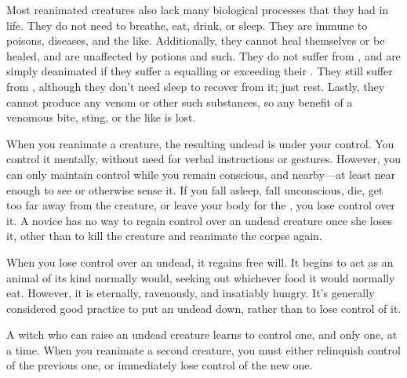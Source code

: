 Most reanimated creatures also lack many biological processes that they had in life.
They do not need to breathe, eat, drink, or sleep.
They are immune to poisons, diseases, and the like.
Additionally, they cannot heal themselves or be healed, and are unaffected by potions and such.
They do not suffer from {\shock}, and are simply deanimated if they suffer a {\damagetest} equalling or exceeding their .
They still suffer from {\exhaustion}, although they don't need sleep to recover from it; just rest.
Lastly, they cannot produce any venom or other such substances, so any benefit of a venomous bite, sting, or the like is lost.

When you reanimate a creature, the resulting undead is under your control.
You control it mentally, without need for verbal instructions or gestures.
However, you can only maintain control while you remain conscious, and nearby---at least near enough to see or otherwise sense it.
If you fall asleep, fall unconscious, die, get too far away from the creature, or leave your body for the {\mentalrealm}, you lose control over it.
A novice  has no way to regain control over an undead creature once she loses it, other than to kill the creature and reanimate the corpse again.

When you lose control over an undead, it regains free will.
It begins to act as an animal of its kind normally would, seeking out whichever food it would normally eat.
However, it is eternally, ravenously, and insatiably hungry.
It's generally considered good practice to put an undead down, rather than to lose control of it.

A witch who can raise an undead creature learns to control one, and only one, at a time.
When you reanimate a second creature, you must either relinquish control of the previous one, or immediately lose control of the new one.


